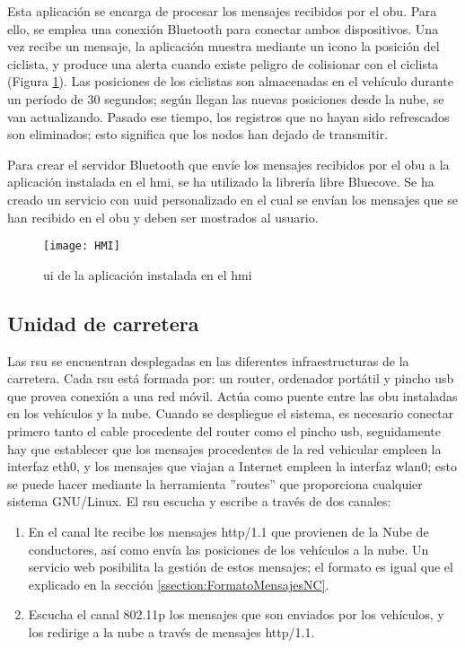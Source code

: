 Esta aplicación se encarga de procesar los mensajes recibidos por el \gls{obu}.
Para ello, se emplea una conexión Bluetooth para conectar ambos dispositivos.
Una vez recibe un mensaje, la aplicación muestra mediante un icono la posición
del ciclista, y produce una alerta cuando existe peligro de colisionar con el
ciclista (Figura \ref{fig:HMI}). Las posiciones de los ciclistas son
almacenadas en el vehículo durante un período de 30 segundos; según llegan las
nuevas posiciones desde la nube, se van actualizando. Pasado ese tiempo, los
registros que no hayan sido refrescados son eliminados; esto significa que los
nodos han dejado de transmitir.

Para crear el servidor Bluetooth que envíe los mensajes recibidos por el
\gls{obu} a la aplicación instalada en el \gls{hmi}, se ha utilizado la
librería libre Bluecove. Se ha creado un servicio con \gls{uuid} personalizado
en el cual se envían los mensajes que se han recibido en el \gls{obu} y deben
ser mostrados al usuario.

\begin{figure}[H]
	\begin{center}
		\texttt{[image: HMI]}
		\caption{\gls{ui} de la aplicación instalada en el \gls{hmi}}
		\label{fig:HMI}
	\end{center}
\end{figure}

\subsection{Unidad de carretera}
Las \gls{rsu} se encuentran desplegadas en las diferentes infraestructuras de
la carretera. Cada \gls{rsu} está formada por: un router, ordenador portátil
y pincho \gls{usb} que provea conexión a una red móvil. Actúa como puente
entre las \gls{obu} instaladas en los vehículos y la nube. Cuando se despliegue
el sistema, es necesario conectar primero tanto el cable procedente del router
como el pincho \gls{usb}, seguidamente hay que establecer que los mensajes
procedentes de la red vehicular empleen la interfaz eth0, y los mensajes que
viajan a Internet empleen la interfaz wlan0; esto se puede hacer mediante la
herramienta ''routes'' que proporciona cualquier sistema GNU/Linux. El
\gls{rsu} escucha y escribe a través de dos canales:
\begin{enumerate}
	\item En el canal \gls{lte} recibe los mensajes \Gls{http/1.1} que provienen
	de la Nube de conductores, así como envía las posiciones de los vehículos a
	la nube. Un 	servicio web posibilita la gestión de estos mensajes; el
	formato es igual que el	explicado en la sección \ref{ssection:FormatoMensajesNC}.

	\item Escucha el canal \Gls{802.11p} los mensajes que son enviados por
	los vehículos, y los redirige a la nube a través de mensajes \Gls{http/1.1}.
\end{enumerate}


